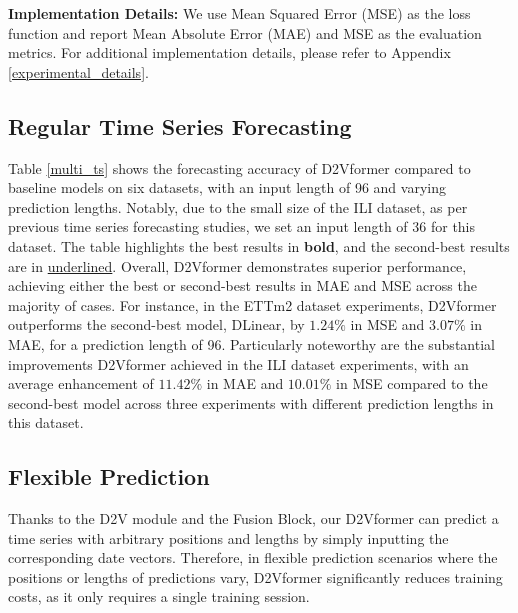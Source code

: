 \documentclass{article}
\begin{document}
\textbf{Implementation Details:} We use Mean Squared Error (MSE) as the loss function and report Mean Absolute Error (MAE) and MSE as the evaluation metrics. For additional implementation details, please refer to Appendix \ref{experimental_details}.



\subsection{Regular Time Series Forecasting } \label{multivariate}

Table \ref{multi_ts} shows the forecasting accuracy of D2Vformer compared to baseline models on six datasets, with an input length of 96 and varying prediction lengths. 
Notably, due to the small size of the ILI dataset, as per previous time series forecasting studies\cite{autoformer,fedformer,patchtst}, we set an input length of 36 for this dataset. The table highlights the best results in \textbf{bold}, and the second-best results are in \underline{underlined}.
Overall, D2Vformer demonstrates superior performance, achieving either the best or second-best results in MAE and MSE across the majority of cases. 
For instance, in the ETTm2 dataset experiments, D2Vformer outperforms the second-best model, DLinear, by $1.24\%$ in MSE and $3.07\%$ in MAE, for a prediction length of 96. Particularly noteworthy are the substantial improvements D2Vformer achieved in the ILI dataset experiments, with an average enhancement of $11.42\%$ in MAE and $10.01\%$ in MSE compared to the second-best model  across three experiments with different prediction lengths in this dataset.



\subsection{Flexible Prediction } \label{skip_prediction}
Thanks to the D2V module and the Fusion Block, our D2Vformer can predict a time series with arbitrary positions and lengths by simply inputting the corresponding date vectors. Therefore, in flexible prediction scenarios where the positions or lengths of predictions vary, D2Vformer significantly reduces training costs, as it only requires a single training session. 
\end{document}
